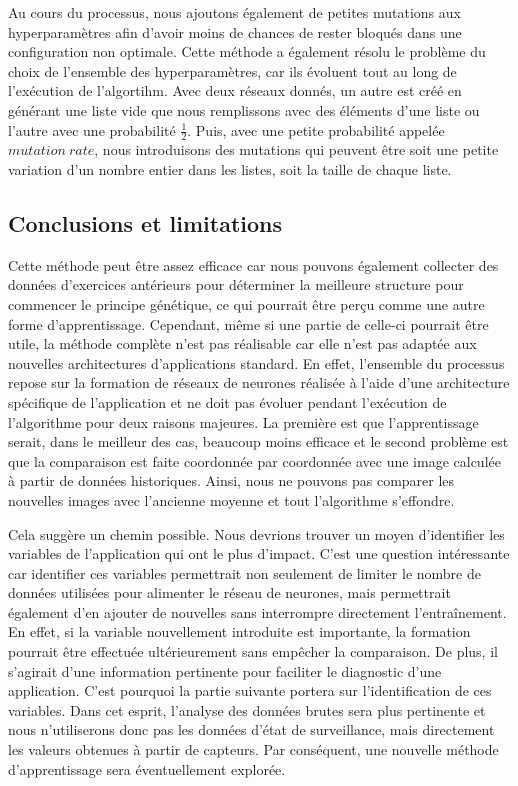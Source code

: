 \documentclass[10pt,a4paper,oneside]{article}
\begin{document}
\begin{multicols}{2}
Au cours du processus, nous ajoutons également de petites mutations aux hyperparamètres afin d’avoir moins de chances de rester bloqués dans une configuration non optimale. Cette méthode a également résolu le problème du choix de l’ensemble des hyperparamètres, car ils évoluent tout au long de l’exécution de l’algortihm.
Avec deux réseaux donnés, un autre est créé en générant une liste vide que nous remplissons avec des éléments d'une liste ou l'autre avec une probabilité $\frac{1}{2}$. Puis, avec une petite probabilité appelée $mutation ~rate$, nous introduisons des mutations qui peuvent être soit une petite variation d’un nombre entier dans les listes, soit la taille de chaque liste.


\subsection{Conclusions et limitations}
Cette méthode peut être assez efficace car nous pouvons également collecter des données d’exercices antérieurs pour déterminer la meilleure structure pour commencer le principe génétique, ce qui pourrait être perçu comme une autre forme d’apprentissage. Cependant, même si une partie de celle-ci pourrait être utile, la méthode complète n'est pas réalisable car elle n'est pas adaptée aux nouvelles architectures d'applications standard. En effet, l'ensemble du processus repose sur la formation de réseaux de neurones réalisée à l'aide d'une architecture spécifique de l'application et ne doit pas évoluer pendant l'exécution de l'algorithme pour deux raisons majeures. La première est que l'apprentissage serait, dans le meilleur des cas, beaucoup moins efficace et le second problème est que la comparaison est faite coordonnée par coordonnée avec une image calculée à partir de données historiques. Ainsi, nous ne pouvons pas comparer les nouvelles images avec l'ancienne moyenne et tout l'algorithme s'effondre.

Cela suggère un chemin possible. Nous devrions trouver un moyen d'identifier les variables de l'application qui ont le plus d'impact. C'est une question intéressante car identifier ces variables permettrait non seulement de limiter le nombre de données utilisées pour alimenter le réseau de neurones, mais permettrait également d'en ajouter de nouvelles sans interrompre directement l'entraînement. En effet, si la variable nouvellement introduite est importante, la formation pourrait être effectuée ultérieurement sans empêcher la comparaison. De plus, il s'agirait d'une information pertinente pour faciliter le diagnostic d'une application. C'est pourquoi la partie suivante portera sur l'identification de ces variables. Dans cet esprit, l'analyse des données brutes sera plus pertinente et nous n'utiliserons donc pas les données d'état de surveillance, mais directement les valeurs obtenues à partir de capteurs. Par conséquent, une nouvelle méthode d'apprentissage sera éventuellement explorée.



\end{multicols}
\end{document}
